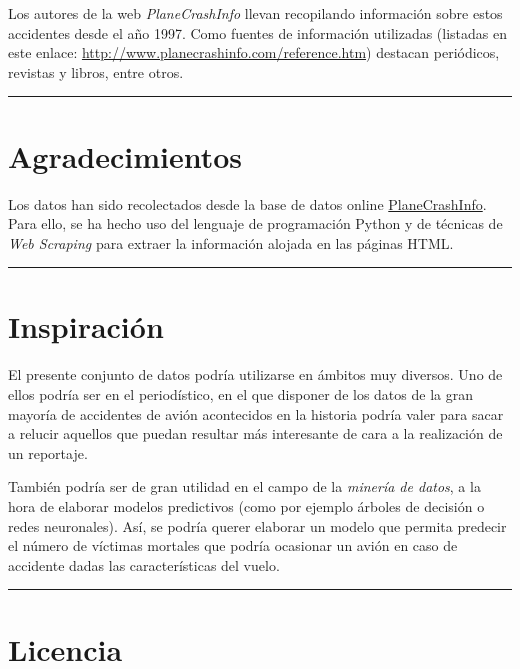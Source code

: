 \documentclass[]{article}
\begin{document}
Los autores de la web \emph{PlaneCrashInfo} llevan recopilando
información sobre estos accidentes desde el año 1997. Como fuentes de
información utilizadas (listadas en este enlace:
\url{http://www.planecrashinfo.com/reference.htm}) destacan periódicos,
revistas y libros, entre otros.

\begin{center}\rule{0.5\linewidth}{0.5pt}\end{center}

\hypertarget{agradecimientos}{%
\section{Agradecimientos}\label{agradecimientos}}

Los datos han sido recolectados desde la base de datos online
\href{http://www.planecrashinfo.com/database.htm}{PlaneCrashInfo}. Para
ello, se ha hecho uso del lenguaje de programación Python y de técnicas
de \emph{Web Scraping} para extraer la información alojada en las
páginas HTML.

\begin{center}\rule{0.5\linewidth}{0.5pt}\end{center}

\hypertarget{inspiraciuxf3n}{%
\section{Inspiración}\label{inspiraciuxf3n}}

El presente conjunto de datos podría utilizarse en ámbitos muy diversos.
Uno de ellos podría ser en el periodístico, en el que disponer de los
datos de la gran mayoría de accidentes de avión acontecidos en la
historia podría valer para sacar a relucir aquellos que puedan resultar
más interesante de cara a la realización de un reportaje.

También podría ser de gran utilidad en el campo de la \emph{minería de
datos}, a la hora de elaborar modelos predictivos (como por ejemplo
árboles de decisión o redes neuronales). Así, se podría querer elaborar
un modelo que permita predecir el número de víctimas mortales que podría
ocasionar un avión en caso de accidente dadas las características del
vuelo.

\begin{center}\rule{0.5\linewidth}{0.5pt}\end{center}

\hypertarget{licencia}{%
\section{Licencia}\label{licencia}}
\end{document}
